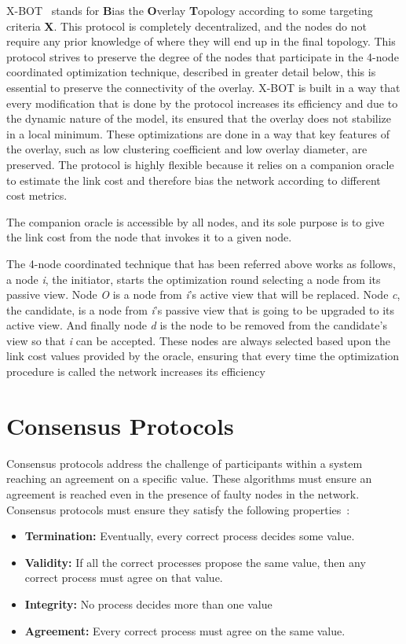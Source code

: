 X-BOT~\cite{xbot} stands for \textbf{B}ias the \textbf{O}verlay \textbf{T}opology
according to some targeting criteria \textbf{X}. This protocol is completely decentralized,
and the nodes do not require any prior knowledge of where they will end up in the final topology. 
This protocol strives to preserve the degree of the nodes that participate in the 4-node coordinated
optimization technique, described in greater detail below, this is essential to preserve
the connectivity of the overlay. X-BOT is built in a way that every modification that is
done by the protocol increases its efficiency and due to the dynamic nature of the model,
its ensured that the overlay does not stabilize in a local minimum. These optimizations
are done in a way that key features of the overlay, such as low clustering coefficient and
low overlay diameter, are preserved. The protocol is highly flexible because it relies on a
companion oracle to estimate the link cost and therefore bias the network according to
different cost metrics.

The companion oracle is accessible by all nodes, and its sole purpose is to give the
link cost from the node that invokes it to a given node.

The 4-node coordinated technique that has been referred above works as follows, a
node \textit{i}, the initiator, starts the optimization round selecting a node from
its passive view. Node \textit{O} is a node from \textit{i}'s active view that
will be replaced. Node \textit{c}, the candidate, is a node from \textit{i}'s passive
view that is going to be upgraded to its active view. And finally node \textit{d}
is the node to be removed from the candidate's view so that \textit{i} can be accepted.
These nodes are always selected based upon the link cost values provided by the oracle,
ensuring that every time the optimization procedure is called the network increases its
efficiency

\section{Consensus Protocols}\label{sec:consensus}

Consensus protocols address the challenge of participants within a system reaching 
an agreement on a specific value.
These algorithms must ensure an agreement is reached
even in the presence of faulty nodes in the network. Consensus protocols must ensure
they satisfy the following properties~\cite{distributed_systems_concepts}:
\begin{itemize}
  \item \textbf{Termination:} Eventually, every correct process decides some value.
  \item \textbf{Validity:} If all the correct processes propose the same value,
then any correct process must agree on that value.
  \item \textbf{Integrity:} No process decides more than one value
  \item \textbf{Agreement:} Every correct process must agree on the same value.
\end{itemize}

